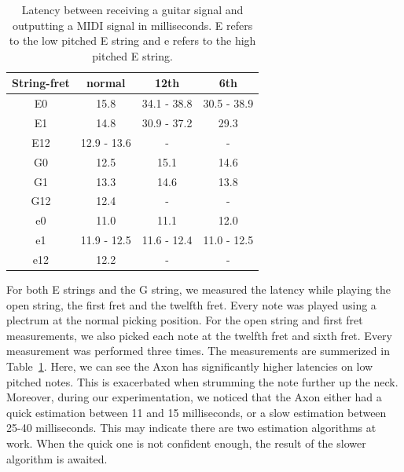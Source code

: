 \documentclass[a4paper,10pt,twocolumn]{article}
\begin{document}
\begin{table}[t]
    \centering
    \begin{tabular}{c|ccc}
        String-fret & normal & 12th & 6th \\
        \hline
        E0  & 15.8 & 34.1 - 38.8 & 30.5 - 38.9 \\
        E1  & 14.8 & 30.9 - 37.2 & 29.3 \\
        E12 & 12.9 - 13.6 & - & - \\
        G0  & 12.5 & 15.1 & 14.6 \\
        G1  & 13.3 & 14.6 & 13.8 \\
        G12 & 12.4 & - & - \\
        e0  & 11.0 & 11.1 & 12.0 \\
        e1  & 11.9 - 12.5 & 11.6 - 12.4 & 11.0 - 12.5 \\
        e12 & 12.2 & - & -
    \end{tabular}
    \caption{Latency between receiving a guitar signal and outputting a MIDI signal in milliseconds. E refers to the low pitched E string and e refers to the high pitched E string.}
    \label{tab:osc_results}
\end{table}

For both E strings and the G string, we measured the latency while playing the open string, the first fret and the twelfth fret. Every note was played using a plectrum at the normal picking position. For the open string and first fret measurements, we also picked each note at the twelfth fret and sixth fret. Every measurement was performed three times. The measurements are summerized in Table~\ref{tab:osc_results}. Here, we can see the Axon has significantly higher latencies on low pitched notes. This is exacerbated when strumming the note further up the neck. Moreover, during our experimentation, we noticed that the Axon either had a quick estimation between 11 and 15 milliseconds, or a slow estimation between 25-40 milliseconds. This may indicate there are two estimation algorithms at work. When the quick one is not confident enough, the result of the slower algorithm is awaited.

\end{document}
